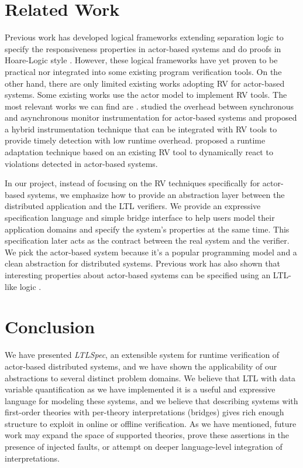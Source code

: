 \documentclass[format=acmsmall, nonacm=true, review=true, screen=true]{acmart}
\newcommand{\ltlspec}{\textit{LTLSpec}\xspace}
\begin{document}
\section{Related Work}

Previous work has developed logical frameworks extending separation logic to specify the responsiveness properties in actor-based systems and do proofs in Hoare-Logic style \cite{actorservice, parthasarathy2018modular}.
However, these logical frameworks have yet proven to be practical nor integrated into some existing program verification tools.
On the other hand, there are only limited existing works adopting RV for actor-based systems.
Some existing works \cite{shafiei2020actor,lavery2017actor} use the actor model to implement RV tools.
The most relevant works we can find are \cite{cassar2015synchronous,cassar2015runtime}.
\cite{cassar2015synchronous} studied the overhead between synchronous and asynchronous monitor instrumentation for actor-based systems and proposed a hybrid instrumentation technique that can be  integrated with RV tools to provide timely detection with low runtime overhead.
\cite{cassar2015runtime} proposed a runtime adaptation technique based on an existing RV tool to dynamically react to violations detected in actor-based systems.

In our project, instead of focusing on the RV techniques specifically for actor-based systems, we emphasize how to provide an abstraction layer between the distributed application and the LTL verifiers.
We provide an expressive specification language and simple bridge interface to help users model their application domains and specify the system's properties at the same time. This specification later acts as the contract between the real system and the verifier.
We pick the actor-based system because it's a popular programming model and a clean abstraction for distributed systems.
Previous work has also shown that interesting properties about actor-based systems can be specified using an LTL-like logic \cite{actorservice, parthasarathy2018modular}.

\section{Conclusion}

We have presented \ltlspec, an extensible system for runtime verification of actor-based distributed systems, and we have shown the applicability of our abstractions to several distinct problem domains. We believe that LTL with data variable quantification as we have implemented it is a useful and expressive language for modeling these systems, and we believe that describing systems with first-order theories with per-theory interpretations (bridges) gives rich enough structure to exploit in online or offline verification. As we have mentioned, future work may expand the space of supported theories, prove these assertions in the presence of injected faults, or attempt on deeper language-level integration of interpretations.



\end{document}
